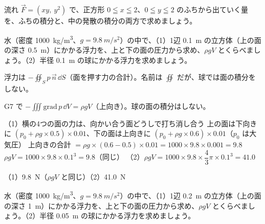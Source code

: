 \begin{jibun}
流れ $\vec F=(xy,\ y^2)$ で、正方形 $0\leqq x\leqq2$、$0\leqq y\leqq2$ のふちから出ていく量を、ふちの積分と、中の発散の積分の両方で求めましょう。
\end{jibun}

\begin{reidai}
水（密度 \qty{1000}{kg/m^3}、$g=\qty{9.8}{m/s^2}$）の中で、（1）1辺 \qty{0.1}{m} の立方体（上の面の深さ \qty{0.5}{m}）にかかる浮力を、上と下の面の圧力から求め、$\rho gV$ とくらべましょう。（2）半径 \qty{0.1}{m} の球にかかる浮力を求めましょう。\par
\kangaekata {}\par
{}\enspace 浮力は $-\oiint_S p\,\vec n\,\dd S$（面を押す力の合計）。名前は $\oiint$ だが、球では面の積分をしない。\par
{}\enspace G7 で $-\iiint\mathrm{grad}\,p\,\dd V=\rho gV$（上向き）。球の面の積分はしない。\par
\shiki（1）横の4つの面の力は、向かい合う面どうしで打ち消し合う\kviiilq
上の面は下向きに $(p_0+\rho g\times0.5)\times0.01$、下の面は上向きに $(p_0+\rho g\times0.6)\times0.01$（$p_0$ は大気圧）\kviiilq
上向きの合計 $=\rho g\times(0.6-0.5)\times0.01=1000\times9.8\times0.001=9.8$\kviiilq
$\rho gV=1000\times9.8\times0.1^3=9.8$（同じ）\kviiilq
（2）$\rho gV=1000\times9.8\times\dfrac{4}{3}\pi\times0.1^3=41.0$\par
\kotae（1）\nobreak \qty{9.8}{N}（$\rho gV$ と同じ）\quad（2）\nobreak \qty{41.0}{N}
\end{reidai}

\begin{jibun}
水（密度 \qty{1000}{kg/m^3}、$g=\qty{9.8}{m/s^2}$）の中で、（1）1辺 \qty{0.2}{m} の立方体（上の面の深さ \qty{1}{m}）にかかる浮力を、上と下の面の圧力から求め、$\rho gV$ とくらべましょう。（2）半径 \qty{0.05}{m} の球にかかる浮力を求めましょう。
\end{jibun}

